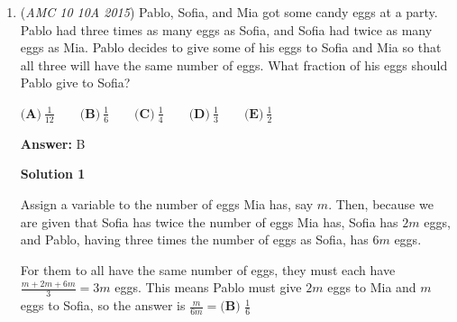 \begin{enumerate}
\textbf{Solution 2}

Alternatively, we can see with the $3$-step staircase has $2[2(3)+2+1]=18$ toothpicks. Generalizing, we see that a staircase with $x$ steps has $2[2x+(x-1)+(x-2)+...+1]$ toothpicks. So, for $x=5$ steps, we have $2[2(5)+4+3+2+1]=40$ toothpicks. So our answer is $40-18=22$ or $D$.

 



\textbf{Solution 3}

If one is too lazy to derive a formula for the number of picks needed for a given number of steps, one can simply see that to get to $4$ steps, we add two blobs that have three picks each (the top and the right), and two more blobs that have two blocks each to form the steps. This adds $2\cdot3+2\cdot2=10$ picks. Then, to get to $5$ steps, we add two more edge blobs with $3$ picks each and $3$ more blobs that have two picks each. We add $2\cdot3+3\cdot2=12$ more for a total increase of $10+12=\boxed{\textbf{(D)}~22}.$
\begin{verbatim}
\href{https://youtu.be/StaCPwJ9zSU}{https://youtu.be/StaCPwJ9zSU}
\end{verbatim}





	\item (\textit{AMC 10 10A 2015}) Pablo, Sofia, and Mia got some candy eggs at a party.  Pablo had three times as many eggs as Sofia, and Sofia had twice as many eggs as Mia.  Pablo decides to give some of his eggs to Sofia and Mia so that all three will have the same number of eggs.  What fraction of his eggs should Pablo give to Sofia?


 $\textbf{(A)}\ \frac{1}{12}\qquad\textbf{(B)}\ \frac{1}{6}\qquad\textbf{(C)}\ \frac{1}{4}\qquad\textbf{(D)}\ \frac{1}{3}\qquad\textbf{(E)}\ \frac{1}{2}$

 \textbf{Answer: }B



\textbf{Solution 1}

Assign a variable to the number of eggs Mia has, say $m$.  Then, because we are given that Sofia has twice the number of eggs Mia has, Sofia has $2m$ eggs, and Pablo, having three times the number of eggs as Sofia, has $6m$ eggs.

 For them to all have the same number of eggs, they must each have $\frac{m+2m+6m}{3} = 3m$ eggs.  This means Pablo must give $2m$ eggs to Mia and $m$ eggs to Sofia, so the answer is $\frac{m}{6m} = \boxed{\textbf{(B) }\frac{1}{6}}$





\end{enumerate}
